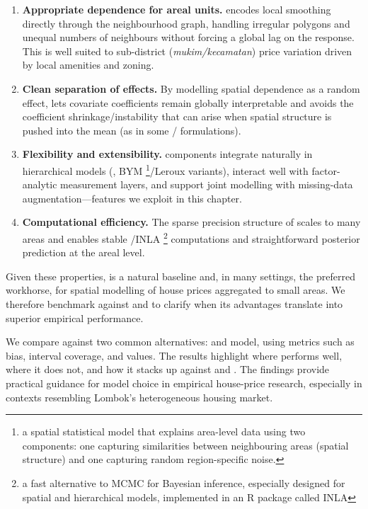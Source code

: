 \documentclass[
  letterpaper,
  DIV=11,
  numbers=noendperiod]{scrartcl}
\begin{document}
\begin{enumerate}
\def\labelenumi{\arabic{enumi})}
\item
  \textbf{Appropriate dependence for areal units.}  encodes
  local smoothing directly through the neighbourhood graph, handling
  irregular polygons and unequal numbers of neighbours without forcing a
  global lag on the response. This is well suited to sub-district
  (\emph{mukim/kecamatan}) price variation driven by local amenities and
  zoning.
\item
  \textbf{Clean separation of effects.} By modelling spatial dependence
  as a random effect,  lets covariate coefficients remain
  globally interpretable and avoids the coefficient
  shrinkage/instability that can arise when spatial structure is pushed
  into the mean (as in some / formulations).
\item
  \textbf{Flexibility and extensibility.}  components integrate
  naturally in hierarchical models (, BYM
  \footnote{a spatial statistical model that explains area-level data using two components: one capturing similarities between neighbouring areas (spatial structure) and one capturing random region-specific noise.}/Leroux
  variants), interact well with factor-analytic measurement layers, and
  support joint modelling with missing-data augmentation---features we
  exploit in this chapter.
\item
  \textbf{Computational efficiency.} The sparse precision structure of
   scales to many areas and enables stable /INLA
  \footnote{a fast alternative to MCMC for Bayesian inference, especially designed for spatial and hierarchical models, implemented in an R package called INLA}
  computations and straightforward posterior prediction at the areal
  level.
\end{enumerate}

Given these properties,  is a natural baseline and, in many
settings, the preferred workhorse, for spatial modelling of house prices
aggregated to small areas. We therefore benchmark  against
 and  to clarify when its advantages translate into
superior empirical performance.

We compare  against two common alternatives:  and
 model, using metrics such as bias, interval coverage, and
 values. The results highlight where  performs well,
where it does not, and how it stacks up against  and .
The findings provide practical guidance for model choice in empirical
house-price research, especially in contexts resembling Lombok's
heterogeneous housing market.
\end{document}
